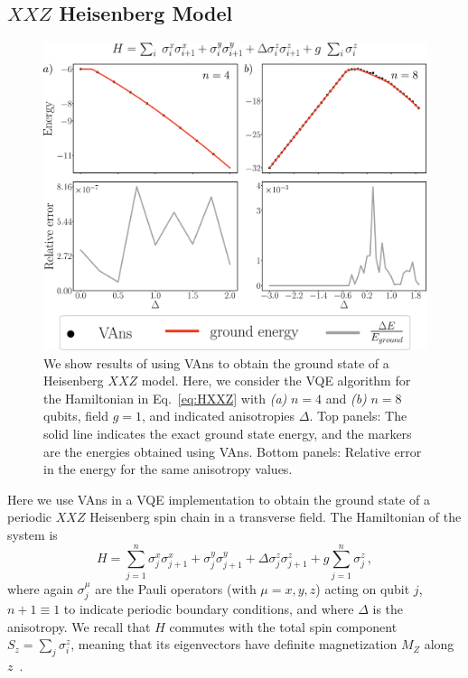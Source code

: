 \subsection{$XXZ$ Heisenberg Model}
\begin{figure}[t!]
\centering
\includegraphics[width=.9\textwidth]{Figures/VANS/Fig8.pdf}
\caption{We show results of using VAns to obtain the ground state of a Heisenberg $XXZ$ model. Here, we consider the VQE algorithm for the Hamiltonian in Eq.~\ref{eq:HXXZ} with \textit{(a)} $n=4$ and \textit{(b)} $n=8$ qubits, field $g=1$, and indicated anisotropies $\Delta$. Top panels: The solid line indicates the exact ground state energy, and the markers are the energies obtained using VAns. Bottom panels: Relative error in the energy for the same anisotropy values.}
\label{fig:XXZ}
\end{figure}
Here we use VAns in a VQE implementation to obtain the ground state of a periodic $XXZ$ Heisenberg spin chain in a transverse field. The Hamiltonian of the system is
\begin{equation}\label{eq:HXXZ}
    H=\sum_{j=1}^n \sigma_j^x\sigma_{j+1}^x+\sigma_j^y\sigma_{j+1}^y+\Delta \sigma_j^z\sigma_{j+1}^z+g\sum_{j=1}^n \sigma_j^z\,,
\end{equation}
where again $\sigma_j^{\mu}$ are the Pauli operators (with $\mu=x,y,z$) acting on qubit $j$, $n+1\equiv 1$ to indicate periodic boundary conditions, and where $\Delta$ is the anisotropy. We recall that $H$ commutes with the total spin component $S_z=\sum_j \sigma^z_i$, meaning that its eigenvectors have definite magnetization $M_Z$ along $z$~\cite{cerezo2017factorization}.


